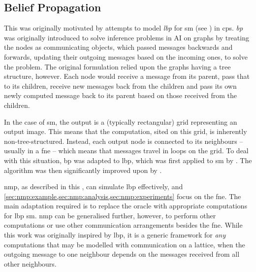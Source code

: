\subsection{Belief Propagation}

This  was originally motivated by attempts to model \emph{\gls{lbp}} for \gls{sm} (see \eg{} \cite{Blake2011,Felzenszwalb2011,Sun2003}) in \gls{cps}.  \emph{\Gls{bp}} was originally introduced to solve inference problems in AI on graphs \cite{Pearl1982} by treating the nodes as communicating objects, which passed messages backwards and forwards, updating their outgoing messages based on the incoming ones, to solve the problem.  The original formulation relied upon the graphs having a tree structure, however.  Each node would receive a message from its parent, pass that to its children, receive new messages back from the children and pass its own newly computed message back to its parent based on those received from the children.

In the case of \gls{sm}, the output is a (typically rectangular) grid representing an output image.  This means that the computation, sited on this grid, is inherently non-tree-structured.  Instead, each output node is connected to its neighbours -- usually in a \gls{fne} -- which means that messages travel in loops on the grid.  To deal with this situation, \gls{bp} was adapted to \gls{lbp}, which was first applied to \gls{sm} by \citeauthor{Sun2003} \cite{Sun2003}.  The algorithm was then significantly improved upon by \citeauthor{Felzenszwalb2006} \cite{Felzenszwalb2006}.

\Gls{nmp}, as described in this , can simulate \gls{lbp} effectively, and \cref{sec:nmp:example,sec:nmp:analysis,sec:nmp:experiments} focus on the \gls{fne}.  The main adaptation required is to replace the oracle with appropriate computations for \gls{lbp} \gls{sm}.  \Gls{nmp} can be generalised further, however, to perform other computations or use other communication arrangements besides the \gls{fne}.  While this work was originally inspired by \gls{lbp}, it is a generic framework for \emph{any} computations that may be modelled with communication on a lattice, when the outgoing message to one neighbour depends on the messages received from all other neighbours.
